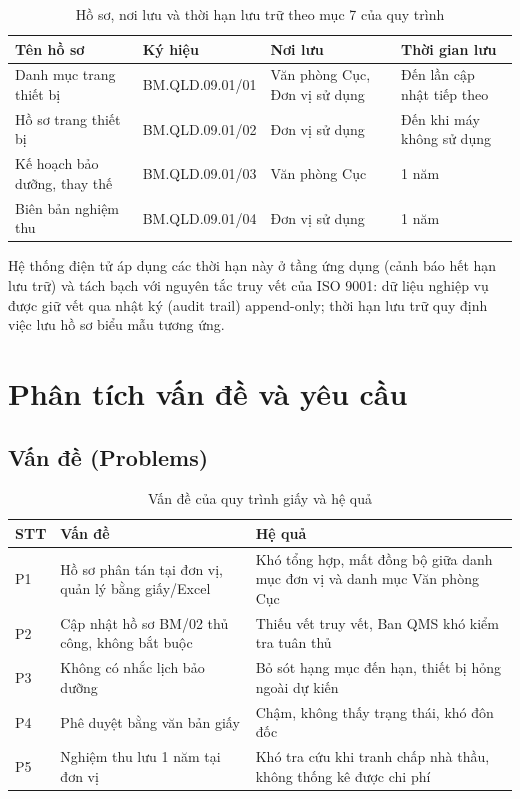 \begin{table}[h]
\centering
\caption{Hồ sơ, nơi lưu và thời hạn lưu trữ theo mục 7 của quy trình}
\label{tab:luutru}
\begin{tabular}{P{6.2cm}P{2.8cm}P{2.4cm}P{3.4cm}}
\toprule
\textbf{Tên hồ sơ} & \textbf{Ký hiệu} & \textbf{Nơi lưu} & \textbf{Thời gian lưu} \\
\midrule
Danh mục trang thiết bị & BM.QLD.09.01/01 & Văn phòng Cục, Đơn vị sử dụng & Đến lần cập nhật tiếp theo \\
Hồ sơ trang thiết bị & BM.QLD.09.01/02 & Đơn vị sử dụng & Đến khi máy không sử dụng \\
Kế hoạch bảo dưỡng, thay thế & BM.QLD.09.01/03 & Văn phòng Cục & 1 năm \\
Biên bản nghiệm thu & BM.QLD.09.01/04 & Đơn vị sử dụng & 1 năm \\
\bottomrule
\end{tabular}
\end{table}

Hệ thống điện tử áp dụng các thời hạn này ở tầng ứng dụng (cảnh báo hết hạn lưu trữ) và tách bạch với nguyên tắc truy vết của ISO 9001: dữ liệu nghiệp vụ được giữ vết qua nhật ký (audit trail) append-only; thời hạn lưu trữ quy định việc lưu hồ sơ biểu mẫu tương ứng.

\section{Phân tích vấn đề và yêu cầu}

\subsection{Vấn đề (Problems)}

\begin{table}[h]
\centering
\caption{Vấn đề của quy trình giấy và hệ quả}
\label{tab:vande}
\begin{tabular}{P{0.8cm}P{6.2cm}P{8cm}}
\toprule
\textbf{STT} & \textbf{Vấn đề} & \textbf{Hệ quả} \\
\midrule
P1 & Hồ sơ phân tán tại đơn vị, quản lý bằng giấy/Excel & Khó tổng hợp, mất đồng bộ giữa danh mục đơn vị và danh mục Văn phòng Cục \\
P2 & Cập nhật hồ sơ BM/02 thủ công, không bắt buộc & Thiếu vết truy vết, Ban QMS khó kiểm tra tuân thủ \\
P3 & Không có nhắc lịch bảo dưỡng & Bỏ sót hạng mục đến hạn, thiết bị hỏng ngoài dự kiến \\
P4 & Phê duyệt bằng văn bản giấy & Chậm, không thấy trạng thái, khó đôn đốc \\
P5 & Nghiệm thu lưu 1 năm tại đơn vị & Khó tra cứu khi tranh chấp nhà thầu, không thống kê được chi phí \\
\bottomrule
\end{tabular}
\end{table}

